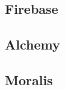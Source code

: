 \subsection{Firebase}
\label{Firebase-desglosado}


\subsection{Alchemy}
\label{Alchemy-desglosado}


\subsection{Moralis}
\label{Moralis-desglosado}
